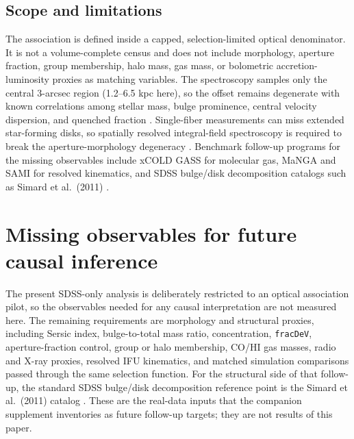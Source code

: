 \documentclass[twocolumn]{aastex631}
\begin{document}
\subsection{Scope and limitations}
The association is defined inside a capped, selection-limited optical denominator. It is not a volume-complete census and does not include morphology, aperture fraction, group membership, halo mass, gas mass, or bolometric accretion-luminosity proxies as matching variables. The spectroscopy samples only the central 3-arcsec region (1.2--6.5 kpc here), so the offset remains degenerate with known correlations among stellar mass, bulge prominence, central velocity dispersion, and quenched fraction \citep{schawinski2010,bluck2014,piotrowska2022}. Single-fiber measurements can miss extended star-forming disks, so spatially resolved integral-field spectroscopy is required to break the aperture-morphology degeneracy \citep{penny2018,cheung2016,bundy2015,canodiaz2016}. Benchmark follow-up programs for the missing observables include xCOLD GASS for molecular gas, MaNGA and SAMI for resolved kinematics, and SDSS bulge/disk decomposition catalogs such as Simard et al.\ (2011) \citep{xcoldgass2017,bundy2015,croom2012,simard2011}.

\section{Missing observables for future causal inference}
The present SDSS-only analysis is deliberately restricted to an optical association pilot, so the observables needed for any causal interpretation are not measured here. The remaining requirements are morphology and structural proxies, including Sersic index, bulge-to-total mass ratio, concentration, \texttt{fracDeV}, aperture-fraction control, group or halo membership, CO/HI gas masses, radio and X-ray proxies, resolved IFU kinematics, and matched simulation comparisons passed through the same selection function. For the structural side of that follow-up, the standard SDSS bulge/disk decomposition reference point is the Simard et al.\ (2011) catalog \citep{simard2011}. These are the real-data inputs that the companion supplement inventories as future follow-up targets; they are not results of this paper.
\end{document}

